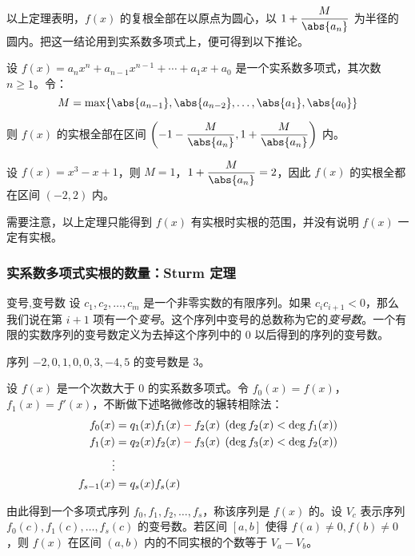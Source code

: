 以上定理表明，$f(x)$ 的复根全部在以原点为圆心，以 $1 + \dfrac{M}{\abs{a_n}}$ 为半径的圆内。把这一结论用到实系数多项式上，便可得到以下推论。

\begin{theorem}
	设 $f(x) = a_n x^n + a_{n - 1} x^{n - 1} + \cdots + a_1 x + a_0$ 是一个实系数多项式，其次数 $n \ge 1$。令：
	$$
	M = \max \{ \abs{a_{n - 1}}, \abs{a_{n - 2}}, \ldots, \abs{a_1}, \abs{a_0} \}
	$$

	则 $f(x)$ 的实根全部在区间 $\biggl( -1 - \dfrac{M}{\abs{a_n}}, 1 + \dfrac{M}{\abs{a_n}} \biggr)$ 内。
\end{theorem}

\begin{example*}
	设 $f(x) = x^3 - x + 1$，则 $M = 1$，$1 + \dfrac{M}{\abs{a_n}} = 2$，因此 $f(x)$ 的实根全都在区间 $(-2, 2)$ 内。
\end{example*}

需要注意，以上定理只能得到 $f(x)$ 有实根时实根的范围，并没有说明 $f(x)$ 一定有实根。

\subsubsection{实系数多项式实根的数量：Sturm 定理}

\begin{definition}{变号,变号数}
	设 $c_1, c_2, \ldots, c_m$ 是一个非零实数的有限序列。如果 $c_i c_{i + 1} < 0$，那么我们说在第 $i + 1$ 项有一个\emph{变号}。这个序列中变号的总数称为它的\emph{变号数}。一个有限的实数序列的变号数定义为去掉这个序列中的 $0$ 以后得到的序列的变号数。
\end{definition}

\begin{example*}
	序列 $-2, 0, 1, 0, 0, 3, -4, 5$ 的变号数是 3。
\end{example*}

\begin{theorem}[Sturm 定理]
	设 $f(x)$ 是一个次数大于 $0$ 的实系数多项式。令 $f_0(x) = f(x)$，$f_1(x) = f'(x)$，不断做下述略微修改的辗转相除法：
	$$
	\begin{aligned}
		f_0(x) &= q_1(x) f_1(x) \mathbin{\textcolor{red}{-}} f_2(x) \pod{\deg f_2(x) < \deg f_1(x)}
		\\
		f_1(x) &= q_2(x) f_2(x) \mathbin{\textcolor{red}{-}} f_3(x) \pod{\deg f_3(x) < \deg f_2(x)}
		\\
		\vdots
		\\
		f_{s - 1}(x) &= q_s(x) f_s(x)
	\end{aligned}
	$$

	由此得到一个多项式序列 $f_0, f_1, f_2, \ldots, f_s$，称该序列是 $f(x)$ 的\emph{}。设 $V_c$ 表示序列 $f_0(c), f_1(c), \ldots, f_s(c)$ 的变号数。若区间 $[a, b]$ 使得 $f(a) \ne 0, f(b) \ne 0$，则 $f(x)$ 在区间 $(a, b)$ 内的不同实根的个数等于 $V_a - V_b$。
\end{theorem}

